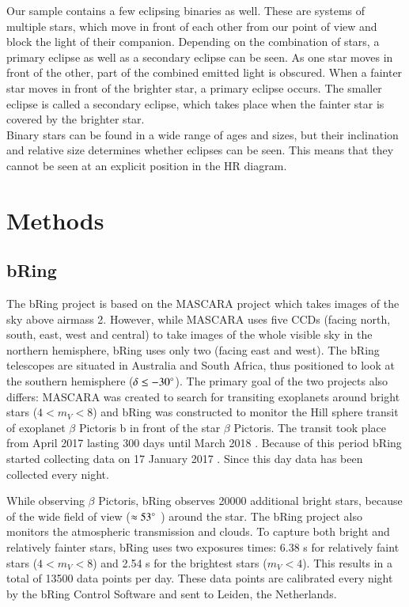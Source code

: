 \documentclass[onecolumn]{aa} %
\begin{document}
Our sample contains a few eclipsing binaries as well. These are systems of multiple stars, which move in front of each other from our point of view and block the light of their companion. Depending on the combination of stars, a primary eclipse as well as a secondary eclipse can be seen. As one star moves in front of the other, part of the combined emitted light is obscured. When a fainter star moves in front of the brighter star, a primary eclipse occurs. The smaller eclipse is called a secondary eclipse, which takes place when the fainter star is covered by the brighter star.\\
Binary stars can be found in a wide range of ages and sizes, but their inclination and relative size determines whether eclipses can be seen. This means that they cannot be seen at an explicit position in the HR diagram.



\section{Methods}
\label{sec:methods}
\subsection{bRing}
The bRing project is based on the MASCARA project \citep{mascara} which takes images of the sky above airmass 2. However, while MASCARA uses five CCDs (facing north, south, east, west and central) to take images of the whole visible sky in the northern hemisphere, bRing uses only two (facing east and west). The bRing telescopes are situated in Australia and South Africa, thus positioned to look at the southern hemisphere ($\delta \leq -30 ^\circ $). The primary goal of the two projects also differs: MASCARA was created to search for transiting exoplanets around bright stars ($4 < m_V < 8$) and bRing was constructed to monitor the Hill sphere transit of exoplanet $\beta$ Pictoris b in front of the star $\beta$ Pictoris. The transit took place from April 2017 lasting 300 days until March 2018 \citep{Wang_2016}. Because of this period bRing started collecting data on 17 January 2017 \citep{bring}. Since this day data has been collected every night.

While observing $\beta$ Pictoris, bRing observes 20000 additional bright stars, because of the wide field of view ($\approx 53^\circ$ ) around the star. The bRing project also monitors the atmospheric transmission and clouds. To capture both bright and relatively fainter stars, bRing uses two exposures times: 6.38 s for relatively faint stars ($4 < m_V < 8$) and 2.54 s for the brightest stars ($m_V < 4$). This results in a total of 13500 data points per day. These data points are calibrated every night by the bRing Control Software and sent to Leiden, the Netherlands.
\end{document}
